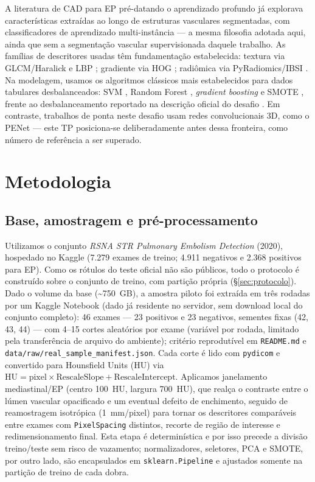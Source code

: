\documentclass[12pt,a4paper]{article}
\begin{document}
A literatura de CAD para EP pré-datando o aprendizado profundo já explorava
características extraídas ao longo de estruturas vasculares segmentadas, com
classificadores de aprendizado multi-instância \cite{bi2007pemultipleinstance} --- a
mesma filosofia adotada aqui, ainda que sem a segmentação vascular supervisionada
daquele trabalho. As famílias de descritores usadas têm fundamentação estabelecida:
textura via GLCM/Haralick \cite{haralick1973textural} e LBP \cite{ojala2002lbp};
gradiente via HOG \cite{dalal2005hog}; radiômica via PyRadiomics/IBSI
\cite{vangriethuysen2017pyradiomics}. Na modelagem, usamos os algoritmos clássicos
mais estabelecidos para dados tabulares desbalanceados: SVM \cite{cortes1995svm},
Random Forest \cite{breiman2001randomforests}, \emph{gradient boosting}
\cite{chen2016xgboost} e SMOTE \cite{chawla2002smote}, frente ao desbalanceamento
reportado na descrição oficial do desafio \cite{colak2021rsnadataset}. Em contraste,
trabalhos de ponta neste desafio usam redes convolucionais 3D, como o PENet
\cite{huang2020penet} --- este TP posiciona-se deliberadamente antes dessa
fronteira, como número de referência a ser superado.

\section{Metodologia}

\subsection{Base, amostragem e pré-processamento}
Utilizamos o conjunto \emph{RSNA STR Pulmonary Embolism Detection} (2020), hospedado
no Kaggle (7.279 exames de treino; 4.911 negativos e 2.368 positivos para EP). Como
os rótulos do teste oficial não são públicos, todo o protocolo é construído sobre o
conjunto de treino, com partição própria (\S\ref{sec:protocolo}). Dado o volume da
base (\textasciitilde750~GB), a amostra piloto foi extraída em três rodadas por um
Kaggle Notebook (dado já residente no servidor, sem download local do conjunto
completo): 46 exames --- 23 positivos e 23 negativos, sementes fixas (42, 43, 44)
--- com 4--15 cortes aleatórios por exame (variável por rodada, limitado pela
transferência de arquivo do ambiente); critério reprodutível em \texttt{README.md}
e \texttt{data/raw/real\_sample\_manifest.json}. Cada corte é lido com
\texttt{pydicom} e convertido para
Hounsfield Units (HU) via $\text{HU} = \text{pixel} \times \text{RescaleSlope} +
\text{RescaleIntercept}$. Aplicamos janelamento mediastinal/EP (centro 100~HU,
largura 700~HU), que realça o contraste entre o lúmen vascular opacificado e um
eventual defeito de enchimento, seguido de reamostragem isotrópica (1~mm/pixel) para
tornar os descritores comparáveis entre exames com \texttt{PixelSpacing} distintos,
recorte de região de interesse e redimensionamento final. Esta etapa é determinística
e por isso precede a divisão treino/teste sem risco de vazamento; normalizadores,
seletores, PCA e SMOTE, por outro lado, são encapsulados em
\texttt{sklearn.Pipeline} e ajustados somente na partição de treino de cada dobra.
\end{document}
